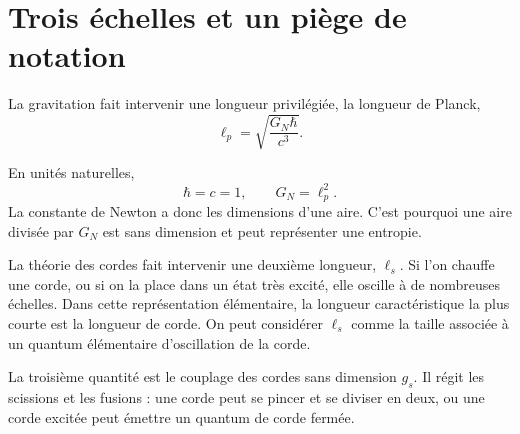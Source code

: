 \section{Trois échelles et un piège de notation}

La gravitation fait intervenir une longueur privilégiée, la longueur de Planck,
\begin{equation}
\ell_p=\sqrt{\frac{G_N\hbar}{c^3}}.
\label{eq:l06-planck-si}
\end{equation}

\begin{classroomqa}
\end{classroomqa}

En unités naturelles,
\begin{equation}
\hbar=c=1,
\qquad
G_N=\ell_p^2.
\label{eq:l06-planck-area}
\end{equation}
La constante de Newton a donc les dimensions d’une aire. C’est pourquoi une aire divisée par \(G_N\) est sans dimension et peut représenter une entropie.

La théorie des cordes fait intervenir une deuxième longueur, \(\ell_s\). Si l’on chauffe une corde, ou si on la place dans un état très excité, elle oscille à de nombreuses échelles. Dans cette représentation élémentaire, la longueur caractéristique la plus courte est la longueur de corde. On peut considérer \(\ell_s\) comme la taille associée à un quantum élémentaire d’oscillation de la corde.

La troisième quantité est le couplage des cordes sans dimension \(g_s\). Il régit les scissions et les fusions : une corde peut se pincer et se diviser en deux, ou une corde excitée peut émettre un quantum de corde fermée.

\begin{classroomqa}
\end{classroomqa}

